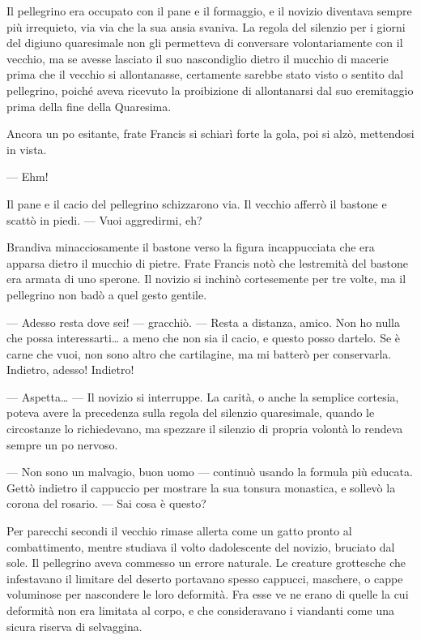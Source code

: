 Il pellegrino era occupato con il pane e il formaggio, e il novizio
diventava sempre più irrequieto, via via che la sua ansia svaniva. La
regola del silenzio per i giorni del digiuno quaresimale non gli
permetteva di conversare volontariamente con il vecchio, ma se avesse
lasciato il suo nascondiglio dietro il mucchio di macerie prima che il
vecchio si allontanasse, certamente sarebbe stato visto o sentito dal
pellegrino, poiché aveva ricevuto la proibizione di allontanarsi dal suo
eremitaggio prima della fine della Quaresima.

Ancora un po\textquotesingle{} esitante, frate Francis si schiarì forte
la gola, poi si alzò, mettendosi in vista.

--- Ehm!

Il pane e il cacio del pellegrino schizzarono via. Il vecchio afferrò il
bastone e scattò in piedi. --- Vuoi aggredirmi, eh?

Brandiva minacciosamente il bastone verso la figura incappucciata che
era apparsa dietro il mucchio di pietre. Frate Francis notò che
l\textquotesingle estremità del bastone era armata di uno sperone. Il
novizio si inchinò cortesemente per tre volte, ma il pellegrino non badò
a quel gesto gentile.

--- Adesso resta dove sei! --- gracchiò. --- Resta a distanza, amico.
Non ho nulla che possa interessarti\ldots{} a meno che non sia il cacio,
e questo posso dartelo. Se è carne che vuoi, non sono altro che
cartilagine, ma mi batterò per conservarla. Indietro, adesso! Indietro!

--- Aspetta\ldots{} --- Il novizio si interruppe. La carità, o anche la
semplice cortesia, poteva avere la precedenza sulla regola del silenzio
quaresimale, quando le circostanze lo richiedevano, ma spezzare il
silenzio di propria volontà lo rendeva sempre un po\textquotesingle{}
nervoso.

--- Non sono un malvagio, buon uomo --- continuò usando la formula più
educata. Gettò indietro il cappuccio per mostrare la sua tonsura
monastica, e sollevò la corona del rosario. --- Sai cosa è questo?

Per parecchi secondi il vecchio rimase all\textquotesingle erta come un
gatto pronto al combattimento, mentre studiava il volto
d\textquotesingle adolescente del novizio, bruciato dal sole. Il
pellegrino aveva commesso un errore naturale. Le creature grottesche che
infestavano il limitare del deserto portavano spesso cappucci, maschere,
o cappe voluminose per nascondere le loro deformità. Fra esse ve ne
erano di quelle la cui deformità non era limitata al corpo, e che
consideravano i viandanti come una sicura riserva di selvaggina.

